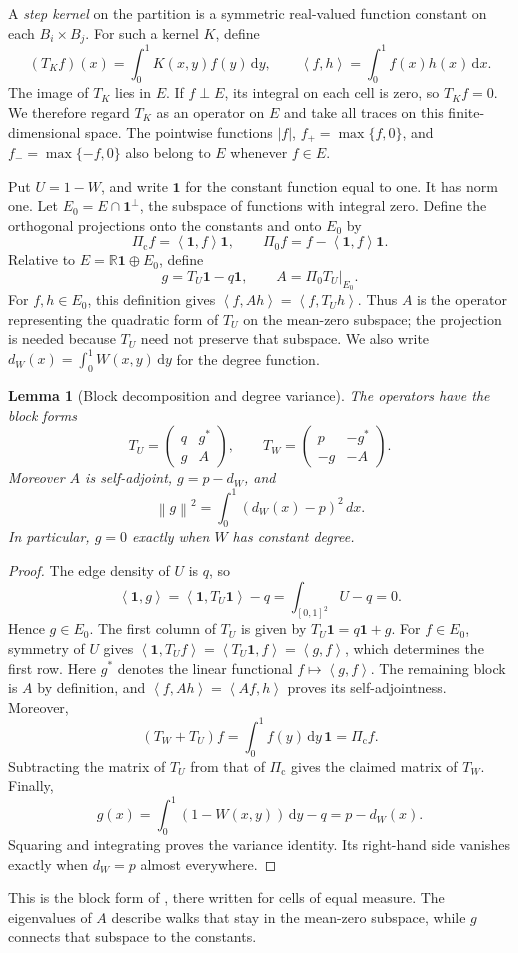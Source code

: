 \documentclass[11pt]{article}
\numberwithin{equation}{section}
\newtheorem{lemma}[theorem]{Lemma}
\newcommand{\one}{\mathbf 1}
\newcommand{\R}{\mathbb R}
\newcommand{\norm}[1]{\left\lVert #1\right\rVert}
\newcommand{\ip}[2]{\left\langle #1,#2\right\rangle}
\newcommand{\dd}{\,\mathrm d}
\begin{document}
A \emph{step kernel} on the partition is a symmetric real-valued
function constant on each $B_i\times B_j$. For such a kernel $K$,
define
\[
 (T_Kf)(x)=\int_0^1K(x,y)f(y)\dd y,
 \qquad \ip fh=\int_0^1 f(x)h(x)\dd x.
\]
The image of $T_K$ lies in $E$. If $f\perp E$, its integral on
each cell is zero, so $T_Kf=0$. We therefore regard $T_K$ as an
operator on $E$ and take all traces on this finite-dimensional
space. The pointwise functions $|f|$, $f_+=\max\{f,0\}$, and
$f_-=\max\{-f,0\}$ also belong to $E$ whenever $f\in E$.

Put $U=1-W$, and write $\one$ for the constant function equal to
one. It has norm one. Let $E_0=E\cap\one^\perp$, the subspace
of functions with integral zero. Define the orthogonal projections
onto the constants and onto $E_0$ by
\[
 \Pi_{\mathrm c}f=\ip\one f\one,
 \qquad \Pi_0f=f-\ip\one f\one.
\]
Relative to $E=\R\one\oplus E_0$, define
\[
 g=T_U\one-q\one,\qquad A=\Pi_0T_U|_{E_0}.
\]
For $f,h\in E_0$, this definition gives
$\ip f{Ah}=\ip f{T_Uh}$. Thus $A$ is the operator representing
the quadratic form of $T_U$ on the mean-zero subspace; the
projection is needed because $T_U$ need not preserve that subspace.
We also write $d_W(x)=\int_0^1W(x,y)\dd y$ for the degree function.
\begin{lemma}[Block decomposition and degree variance]\label{lem:blocks}
The operators have the block forms
\begin{equation}\label{eq:blocks}
 T_U=\begin{pmatrix}q&g^*\\g&A\end{pmatrix},\qquad
 T_W=\begin{pmatrix}p&-g^*\\-g&-A\end{pmatrix}.
\end{equation}
Moreover $A$ is self-adjoint, $g=p-d_W$, and
\[
 \norm g^2=\int_0^1(d_W(x)-p)^2\,dx.
\]
In particular, $g=0$ exactly when $W$ has constant degree.
\end{lemma}
\begin{proof}
The edge density of $U$ is $q$, so
\[
 \ip\one g=\ip\one{T_U\one}-q
  =\int_{[0,1]^2}U-q=0.
\]
Hence $g\in E_0$. The first column of $T_U$ is given by
$T_U\one=q\one+g$. For $f\in E_0$, symmetry of $U$ gives
$\ip\one{T_Uf}=\ip{T_U\one}f=\ip gf$, which determines the
first row. Here $g^*$ denotes the linear functional $f\mapsto\ip gf$.
The remaining block is $A$ by definition, and
$\ip f{Ah}=\ip{Af}h$ proves its self-adjointness.
Moreover,
\[
 (T_W+T_U)f=\int_0^1 f(y)\dd y\,\one
  =\Pi_{\mathrm c}f.
\]
Subtracting the matrix of $T_U$ from that of $\Pi_{\mathrm c}$
gives the claimed matrix of $T_W$. Finally,
\[
 g(x)=\int_0^1(1-W(x,y))\dd y-q=p-d_W(x).
\]
Squaring and integrating proves the variance identity. Its right-hand
side vanishes exactly when $d_W=p$ almost everywhere.
\end{proof}
This is the block form of \cite[Eq.~(2.2)]{kim2026goodman}, there
written for cells of equal measure. The eigenvalues of $A$ describe
walks that stay in the mean-zero subspace, while $g$ connects that
subspace to the constants.
\end{document}
